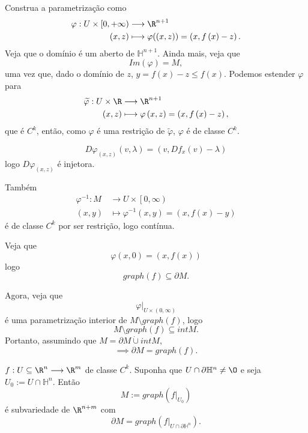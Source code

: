 \begin{demo}
    Construa a parametrização como
    \begin{align*}
        \varphi : U\times \left[ 0,+\infty \right)  &\longrightarrow \R^{n+1} \\
        \left( x,z \right)  &\longmapsto \varphi (\left( x,z \right) ) = \left( x, f\left( x \right) -z \right)
    .\end{align*}
    Veja que o domínio é um aberto de $\mathbb{H}^{n+1}$. Ainda mais, veja que \[
    Im\left( \varphi  \right) = M
    ,\] uma vez que, dado o domínio de $z$, $y=f\left( x \right) - z \le f\left( x \right) $.
    Podemos estender $\varphi $ para 
    \begin{align*}
	\widetilde{\varphi }:  U\times \R   &\longrightarrow \R^{n+1} \\
         \left( x,z \right) &\longmapsto \varphi \left( x,z \right)  = \left( x, f\left( x \right) -z \right) 
    ,\end{align*}
    que é $C^{k}$, então, como $\varphi $ é uma restrição de $\widetilde{\varphi }$, $\varphi $ é de classe $C^{k}$.

    \[
    D\varphi _{\left( x,z \right) }\left( v,\lambda \right) = \left( v, Df_x \left( v \right) - \lambda \right) 
    \] logo $D\varphi _{\left( x,z \right) }$ é injetora.

    Também
    \begin{align*}
        \varphi ^{-1}: M  &\longrightarrow U\times \left[ 0,\infty \right)  \\
         \left( x,y \right) &\longmapsto \varphi ^{-1}\left( x,y \right)  = \left( x, f\left( x \right)-y  \right) 
    \end{align*}
    é de classe $C^{k}$ por ser restrição, logo contínua.

    Veja que \[
    \varphi \left( x, 0 \right)  = \left( x, f\left( x \right)  \right) 
    \] logo \[
    graph\left( f \right) \subseteq \partial M 
    .\] 

    Agora, veja que \[
    \varphi \Big|_{U\times \left( 0,\infty \right) }
    \] é uma parametrização interior de $M\setminus graph \left( f \right) $, logo \[
    M\setminus graph\left( f \right) \subseteq int M
    .\] Portanto, assumindo que $M = \partial M \dot{\cup } int M$, \[
    \implies \partial M = graph\left( f \right) 
    .\] 
\end{demo}

\begin{prop}
    $f: U\subseteq\R^{n} \longrightarrow \R^{m}$ de classe $C^{k}$. Suponha que $U\cap \partial \mathbb{H}^{n} \neq  \O$ e seja $U_0:= U\cap \mathbb{H}^{n}$. Então \[
    M := graph\left( f\Big|_{U_0} \right) 
    \] é subvariedade de $\R^{n+m}$ com \[
    \partial M = graph\left( f \Big|_{U\cap \partial \mathbb{H}^{n}}\right) 
    .\]
\end{prop}

